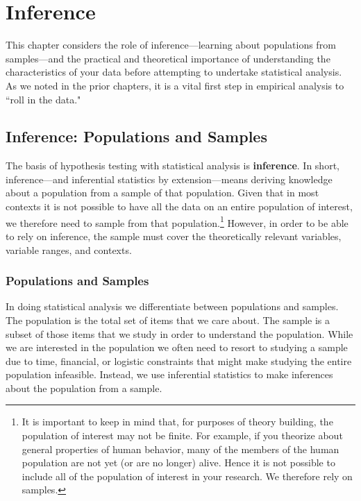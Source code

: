 \documentclass[11pt,openany]{book}\usepackage[]{graphicx}\usepackage[]{color}
\begin{document}
{\chapter{Inference}

This chapter considers the role of inference---learning about populations from samples---and the practical and theoretical importance of understanding the characteristics of your data before attempting to undertake statistical analysis. As we noted in the prior chapters, it is a vital first step in empirical analysis to ``roll in the data."

\section{Inference: Populations and Samples}

The basis of hypothesis testing with statistical analysis is \textbf{inference}. In short, inference---and inferential statistics by extension---means deriving knowledge about a population from a sample of that population. Given that in most contexts it is not possible to have all the data on an entire population of interest, we therefore need to sample from that population.\footnote{It is important to keep in mind that, for purposes of theory building, the population of interest may not be finite. For example, if you theorize about general properties of human behavior, many of the members of the human population are not yet (or are no longer) alive. Hence it is not possible to include all of the population of interest in your research. We therefore rely on samples.} However, in order to be able to rely on inference, the sample must cover the theoretically relevant variables, variable ranges, and contexts. 

\subsection{Populations and Samples} 

In doing statistical analysis we differentiate between populations and samples.  The population is the total set of items that we care about.  The sample is a subset of those items that we study in order to understand the population.  While we are interested in the population we often need to resort to studying a sample due to time, financial, or logistic constraints that might make studying the entire population infeasible. Instead, we use inferential statistics to make inferences about the population from a sample.

}
\end{document}
